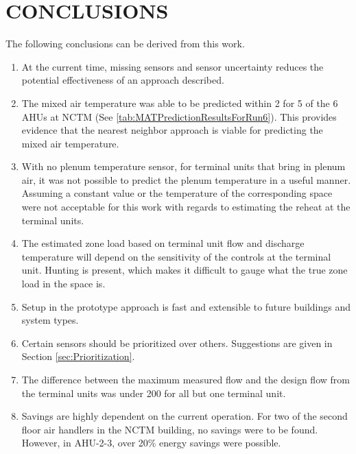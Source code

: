 \chapter{\MakeUppercase{Conclusions}} 

The following conclusions can be derived from this work.

\begin{enumerate}
    \item At the current time, missing sensors and sensor uncertainty 
        reduces the potential effectiveness of an approach described.
    \item The mixed air temperature was able to be predicted within
        \SI{2}{\degF} for 5 of the 6 AHUs at NCTM (See \tableref{}
        \ref{tab:MATPredictionResultsForRun6}). This provides evidence
        that the nearest neighbor approach is viable for predicting the
        mixed air temperature. 
    \item With no plenum temperature sensor, for terminal units that
        bring in plenum air, it was not possible to predict the plenum
        temperature in a useful manner. Assuming a constant value or the
        temperature of the corresponding space were not acceptable for
        this work with regards to estimating the reheat at the terminal units.
    \item The estimated zone load based on terminal unit flow and
        discharge temperature will depend on the sensitivity of the
        controls at the terminal unit. Hunting is present, which makes
        it difficult to gauge what the true zone load in the space is. 
    \item Setup in the prototype approach is fast and extensible to
        future buildings and system types. 
    \item Certain sensors should be prioritized over others. Suggestions
        are given in Section \ref{sec:Prioritization}. 
    \item The difference between the maximum measured flow and the design flow
        from the terminal units was under \SI{200}{\CFM} for all but one
        terminal unit. 
    \item Savings are highly dependent on the current operation. For two
        of the second floor air handlers in the NCTM building, no
        savings were to be found. However, in AHU-2-3, over 20\% energy
        savings were possible. 
\end{enumerate}
